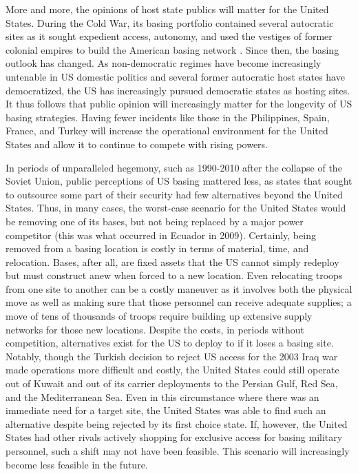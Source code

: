 More and more, the opinions of host state publics will matter for the United States. During the Cold War, its basing portfolio contained several autocratic sites as it sought expedient access, autonomy, and used the vestiges of former colonial empires to build the American basing network \autocite{calder2007,Harkavy1982}. Since then, the basing outlook has changed. As non-democratic regimes have become increasingly untenable in US domestic politics and several former autocratic host states have democratized, the US has increasingly pursued democratic states as hosting sites. It thus follows that public opinion will increasingly matter for the longevity of US basing strategies. Having fewer incidents like those in the Philippines, Spain, France, and Turkey will increase the operational environment for the United States and allow it to continue to compete with rising powers. 

In periods of unparalleled hegemony, such as 1990-2010 after the collapse of the Soviet Union, public perceptions of US basing mattered less, as states that sought to outsource some part of their security had few alternatives beyond the United States. Thus, in many cases, the worst-case scenario for the United States would be removing one of its bases, but not being replaced by a major power competitor (this was what occurred in Ecuador in 2009).\autocite{Fitz2015} Certainly, being removed from a basing location is costly in terms of material, time, and relocation. Bases, after all, are fixed assets that the US cannot simply redeploy but must construct anew when forced to a new location.\autocite{Allen2011} Even relocating troops from one site to another can be a costly maneuver as it involves both the physical move as well as making sure that those personnel can receive adequate supplies; a move of tens of thousands of troops require building up extensive supply networks for those new locations. Despite the costs, in periods without competition, alternatives exist for the US to deploy to if it loses a basing site. Notably,  though the Turkish decision to reject US access for the 2003 Iraq war made operations more difficult and costly, the United States could still operate out of Kuwait and out of its carrier deployments to the Persian Gulf, Red Sea, and the Mediterranean Sea. Even in this circumstance where there was an immediate need for a target site, the United States was able to find such an alternative despite being rejected by its first choice state. If, however, the United States had other rivals actively shopping for exclusive access for basing military personnel, such a shift may not have been feasible. This scenario will increasingly become less feasible in the future. 

